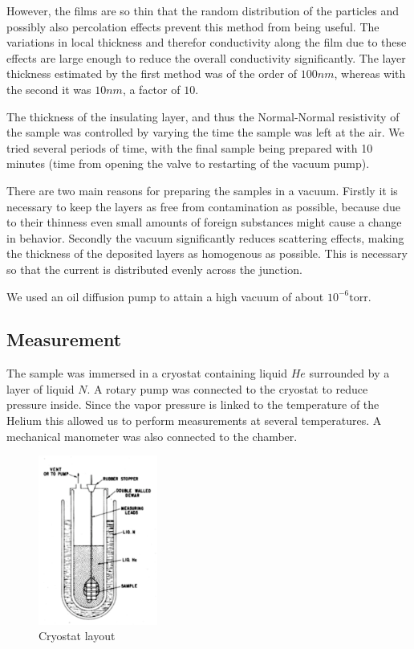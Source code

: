 However, the films are so thin that the random distribution of the particles and possibly also percolation effects prevent this method from being useful. The variations in local thickness and therefor conductivity along the film due to these effects are large enough to reduce the overall conductivity significantly. The layer thickness estimated by the first method was of the order of $100nm$, whereas with the second it was $10nm$, a factor of $10$.

The thickness of the insulating layer, and thus the Normal-Normal resistivity of the sample was controlled by varying the time the sample was left at the air. We tried several periods of time, with the final sample being prepared with 10 minutes (time from opening the valve to restarting of the vacuum pump).

There are two main reasons for preparing the samples in a vacuum. Firstly it is necessary to keep the layers as free from contamination as possible, because due to their thinness even small amounts of foreign substances might cause a change in behavior. Secondly the vacuum significantly reduces scattering effects, making the thickness of the deposited layers as homogenous as possible. This is necessary so that the current is distributed evenly across the junction.

We used an oil diffusion pump to attain a high vacuum of about $10^{-6}\text{torr}$.

\subsection{Measurement}
The sample was immersed in a cryostat containing liquid $He$ surrounded by a layer of liquid $N$. A rotary pump was connected to the cryostat to reduce pressure inside. Since the vapor pressure is linked to the temperature of the Helium this allowed us to perform measurements at several temperatures. A mechanical manometer was also connected to the chamber.

\begin{figure}
\centering
\includegraphics[width=0.35\textwidth]{cryostat.pdf}
\caption{Cryostat layout\label{cryostat}}
\end{figure}

